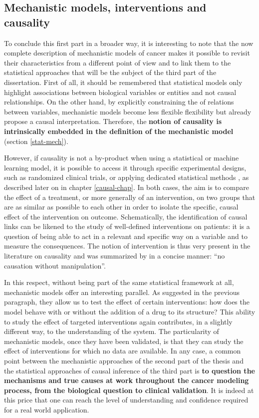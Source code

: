 \documentclass[a4paper,12pt,twoside,onecolumn,openright,final,oldfontcommands]{memoir}
\begin{document}
\subsection{Mechanistic models, interventions and
causality}\label{mechanistic-models-interventions-and-causality}

To conclude this first part in a broader way, it is interesting to note
that the now complete description of mechanistic models of cancer makes
it possible to revisit their characteristics from a different point of
view and to link them to the statistical approaches that will be the
subject of the third part of the dissertation. First of all, it should
be remembered that statistical models only highlight associations
between biological variables or entities and not causal relationships.
On the other hand, by explicitly constraining the of relations between
variables, mechanistic models become less flexible flexibility but
already propose a causal interpretation. Therefore, the \textbf{notion
of causality is intrinsically embedded in the definition of the
mechanistic model} (section \ref{stat-mech}).

However, if causality is not a by-product when using a statistical or
machine learning model, it is possible to access it through specific
experimental designs, such as randomized clinical trials, or applying
dedicated statistical methods \citep{hernan2020causal}, as described
later on in chapter \ref{causal-chap}. In both cases, the aim is to
compare the effect of a treatment, or more generally of an intervention,
on two groups that are as similar as possible to each other in order to
isolate the specific, causal effect of the intervention on outcome.
Schematically, the identification of causal links can be likened to the
study of well-defined interventions on patients: it is a question of
being able to act in a relevant and specific way on a variable and to
measure the consequences. The notion of intervention is thus very
present in the literature on causality
\citep{eberhardt2007interventions} and was summarized by
\citet{holland1986statistics} in a concise manner: ``no causation
without manipulation''.

In this respect, without being part of the same statistical framework at
all, mechanistic models offer an interesting parallel. As suggested in
the previous paragraph, they allow us to test the effect of certain
interventions: how does the model behave with or without the addition of
a drug to its structure? This ability to study the effect of targeted
interventions again contributes, in a slightly different way, to the
understanding of the system. The particularity of mechanistic models,
once they have been validated, is that they can study the effect of
interventions for which no data are available. In any case, a common
point between the mechanistic approaches of the second part of the
thesis and the statistical approaches of causal inference of the third
part is \textbf{to question the mechanisms and true causes at work
throughout the cancer modeling process, from the biological question to
clinical validation}. It is indeed at this price that one can reach the
level of understanding and confidence required for a real world
application.
\end{document}
